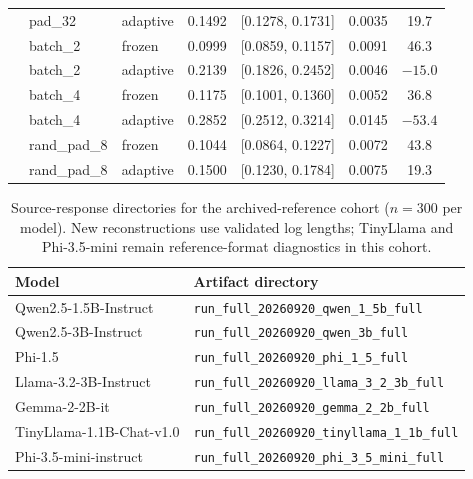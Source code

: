 \begin{table}[ht]
{\begin{tabular}{l l l c c c c}
 & pad\_32 & adaptive & 0.1492 & [0.1278, 0.1731] & 0.0035 & 19.7 \\
 & batch\_2 & frozen & 0.0999 & [0.0859, 0.1157] & 0.0091 & 46.3 \\
 & batch\_2 & adaptive & 0.2139 & [0.1826, 0.2452] & 0.0046 & $-15.0$ \\
 & batch\_4 & frozen & 0.1175 & [0.1001, 0.1360] & 0.0052 & 36.8 \\
 & batch\_4 & adaptive & 0.2852 & [0.2512, 0.3214] & 0.0145 & $-53.4$ \\
 & rand\_pad\_8 & frozen & 0.1044 & [0.0864, 0.1227] & 0.0072 & 43.8 \\
 & rand\_pad\_8 & adaptive & 0.1500 & [0.1230, 0.1784] & 0.0075 & 19.3 \\
\bottomrule
\end{tabular}%
}
\end{table}

\begin{table}[ht]
\centering
\caption{Source-response directories for the archived-reference cohort ($n=300$ per model). New reconstructions use validated log lengths; TinyLlama and Phi-3.5-mini remain reference-format diagnostics in this cohort.}
\label{tab:run_ids}
\begin{tabular}{l l}
\toprule
Model & Artifact directory \\
\midrule
Qwen2.5-1.5B-Instruct & \texttt{run\_full\_20260920\_qwen\_1\_5b\_full} \\
Qwen2.5-3B-Instruct & \texttt{run\_full\_20260920\_qwen\_3b\_full} \\
Phi-1.5 & \texttt{run\_full\_20260920\_phi\_1\_5\_full} \\
Llama-3.2-3B-Instruct & \texttt{run\_full\_20260920\_llama\_3\_2\_3b\_full} \\
Gemma-2-2B-it & \texttt{run\_full\_20260920\_gemma\_2\_2b\_full} \\
TinyLlama-1.1B-Chat-v1.0 & \texttt{run\_full\_20260920\_tinyllama\_1\_1b\_full} \\
Phi-3.5-mini-instruct & \texttt{run\_full\_20260920\_phi\_3\_5\_mini\_full} \\
\bottomrule
\end{tabular}
\end{table}
